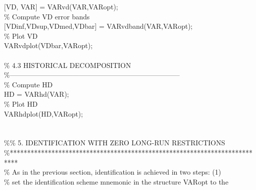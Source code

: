 \hspace{1mm}[VD, VAR] = VARvd(VAR,VARopt); \\ 
\hspace{1mm}\textcolor{matlabgreen}{\% Compute VD error bands }\\ 
\hspace{1mm}[VDinf,VDsup,VDmed,VDbar] = VARvdband(VAR,VARopt); \\ 
\hspace{1mm}\textcolor{matlabgreen}{\% Plot VD }\\ 
\hspace{1mm}VARvdplot(VDbar,VARopt); \\ 
\hspace{1mm} \\ 
\hspace{1mm}\textcolor{matlabgreen}{\% 4.3 HISTORICAL DECOMPOSITION }\\ 
\hspace{1mm}\textcolor{matlabgreen}{\%--------------------------------------------------------------------------  }\\ 
\hspace{1mm}\textcolor{matlabgreen}{\% Compute HD }\\ 
\hspace{1mm}HD = VARhd(VAR); \\ 
\hspace{1mm}\textcolor{matlabgreen}{\% Plot HD }\\ 
\hspace{1mm}VARhdplot(HD,VARopt); \\ 
\hspace{1mm} \\ 
\hspace{1mm} \\ 
\hspace{1mm}\textcolor{matlabgreen}{\%}\textcolor{matlabgreen}{\% 5. IDENTIFICATION WITH ZERO LONG-RUN RESTRICTIONS  }\\ 
\hspace{1mm}\textcolor{matlabgreen}{\%**************************************************************************  }\\ 
\hspace{1mm}\textcolor{matlabgreen}{\% As in the previous section, identification is achieved in two steps: (1)  }\\ 
\hspace{1mm}\textcolor{matlabgreen}{\% set the identification scheme mnemonic in the structure VARopt to the  }\\ 
